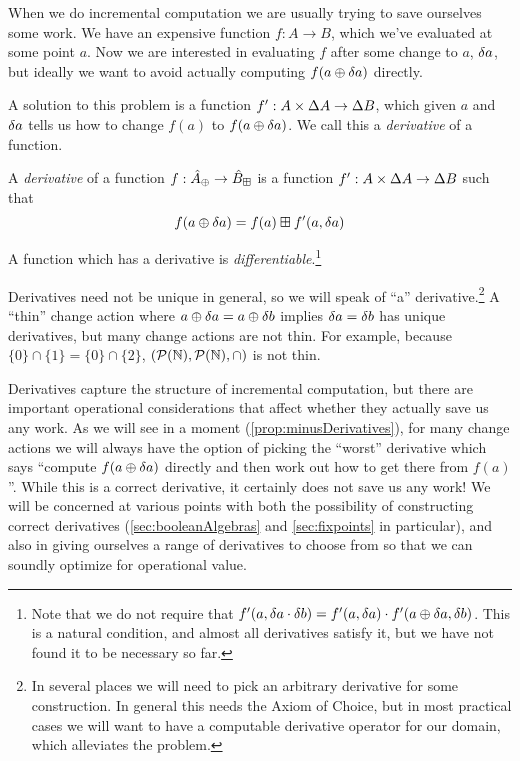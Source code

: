 When we do incremental computation we are usually trying to save ourselves some
work. We have an expensive function $f: A \rightarrow B$, which we've evaluated at some point
$a$. Now we are interested in evaluating $f$ after some change to $a$,
$\delta a$, but ideally we want to avoid actually computing $f(a \oplus
\delta a)$ directly.

A solution to this problem is a function $f': A \times \Delta A
\rightarrow \Delta B$, which given $a$ and $\delta a$ tells us how to change
$f(a)$ to $f(a \oplus \delta a)$. We call this a \emph{derivative} of a function.

\begin{defn}[Derivatives]
  \label{def:derivative}
  A \emph{derivative} of a function $f: \hat{A}_\oplus \rightarrow \hat{B}_\boxplus$ is a function $f': A \times \Delta A \rightarrow
  \Delta B$ such that
  \begin{displaymath}
    f(a \oplus \delta a) = f(a) \boxplus f'(a, \delta a)
  \end{displaymath}

  A function which has a derivative is 
  \emph{differentiable}.\footnote{Note that we do not require that $f'(a,
    \delta a \cdot \delta b) = f'(a, \delta a) \cdot f'(a
    \oplus \delta a, \delta b)$. This is a natural condition, and almost all
    derivatives satisfy it, but we have not found it to be necessary so far.}
\end{defn}

Derivatives need not be unique in general, so we will speak of ``a''
derivative.\footnote{In several places we will need to pick an arbitrary
  derivative for some construction. In general this needs the Axiom of Choice,
  but in most practical cases we will want to have a computable derivative
  operator for our domain, which alleviates the problem.} A ``thin'' change
action \textemdash{} where $a \oplus \delta a = a \oplus \delta b$ implies $\delta a =
\delta b$ \textemdash{} has unique derivatives, but many change actions are not thin.
For example, because $\{0\} \cap \{1\} = \{0\}
\cap \{2\}$, $(\mathcal{P}(\mathbb{N}),\mathcal{P}(\mathbb{N}),\cap)$ is not thin.

Derivatives capture the structure of incremental computation, but there are
important operational considerations that affect whether they actually save us
any work. As we will see in a moment (\cref{prop:minusDerivatives}), for many change actions we will always have the option
of picking the ``worst'' derivative which says ``compute $f(a \oplus \delta a)$
directly and then work out how to get there from $f(a)$''. While this is a correct
derivative, it certainly does not save us any work! We will be concerned at
various points with both the possibility of constructing correct derivatives
(\cref{sec:booleanAlgebras} and \cref{sec:fixpoints} in particular), and also in
giving ourselves a range of derivatives to choose from so that we can soundly
optimize for operational value.

